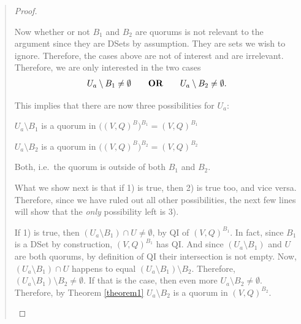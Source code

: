 \begin{quote}
\begin{proof}
\begin{case}
Now whether or not $B_1$ and $B_2$ are quorums is not relevant to the argument since they are DSets by assumption. They are sets we wish to ignore. Therefore, the cases above are not of interest and are irrelevant. Therefore, we are only interested in the two cases
\begin{align}
U_a \setminus B_1 \ne \emptyset \qquad \text{\bf OR} \qquad U_a \setminus B_2 \ne \emptyset.
\end{align}

This implies that there are now three possibilities for $U_a$:
\vspace{0.3cm}
\begin{packed_enumerate}
\item $U_a \setminus B_1$ is a quorum in $\big( (V, Q)^B \big)^{B_1} = (V, Q)^{B_1}$
\item $U_a \setminus B_2$ is a quorum in $\big( (V, Q)^B \big)^{B_2} = (V, Q)^{B_2}$
\item Both, i.e.\ the quorum is outside of both $B_1$ and $B_2$.
\end{packed_enumerate}
\vspace{0.3cm}
What we show next is that if 1) is true, then 2) is true too, and vice versa. Therefore, since we have ruled out all other possibilities, the next few lines will show that the \emph{only} possibility left is 3).

\vspace{0.3cm}
If 1) is true, then $(U_a \setminus B_1) \cap U \ne \emptyset$, by QI of $(V, Q)^{B_1}$.
In fact, since $B_1$ is a DSet by construction, $(V, Q)^{B_1}$ has QI. And since $(U_a \setminus B_1)$ and $U$ are both quorums, by definition of QI their intersection is not empty.
Now, $(U_a \setminus B_1) \cap U$ happens to equal $(U_a \setminus B_1) \setminus B_2$. Therefore, $(U_a \setminus B_1) \setminus B_2 \ne \emptyset$. If that is the case, then even more
$U_a \setminus B_2 \ne \emptyset$. Therefore, by Theorem \ref{theorem1} $U_a \setminus B_2$ is a quorum in $(V, Q)^{B_2}$.


\end{case}
\end{proof}
\end{quote}
